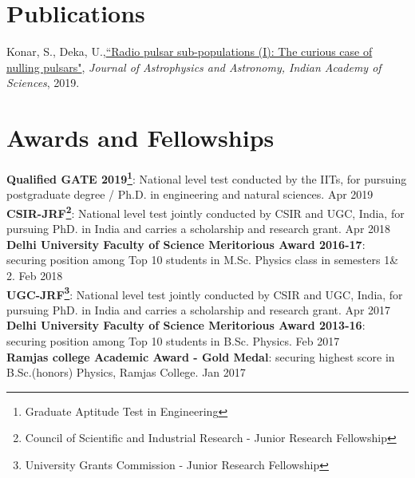 \documentclass[margin,line]{res}
\begin{document}
\begin{resume}
\section{\sc Publications}
\begin{itemize}[noitemsep]
{
\item Konar, S., Deka, U.,\href{https://www.ias.ac.in/article/fulltext/joaa/040/05/0042}{``Radio pulsar sub-populations (I): The curious case of nulling pulsars"}, \textit{Journal of Astrophysics and Astronomy, Indian Academy of Sciences}, 2019.
}\end{itemize}

\section{\sc Awards and Fellowships}

{\bf Qualified GATE 2019\footnote{Graduate Aptitude Test in Engineering}}: National level test conducted by the IITs, for pursuing postgraduate degree / Ph.D. in engineering and natural sciences. \hfill{Apr 2019} \\

{\bf CSIR-JRF\footnote{Council of Scientific and Industrial Research - Junior Research Fellowship}}: National level test jointly conducted by CSIR and UGC, India, for pursuing PhD. in India and carries a scholarship and research grant. \hfill{Apr 2018} \\

{\bf Delhi University Faculty of Science Meritorious Award 2016-17}: securing position among Top 10 students in M.Sc. Physics class in semesters 1\& 2. \hfill{Feb 2018} \\

{\bf UGC-JRF\footnote{University Grants Commission - Junior Research Fellowship}}: National level test jointly conducted by CSIR and UGC, India, for pursuing PhD. in India and carries a scholarship and research grant. \hfill{Apr 2017} \\

{\bf Delhi University Faculty of Science Meritorious Award 2013-16}: securing position among Top 10 students in B.Sc. Physics. \hfill{Feb 2017} \\

{\bf Ramjas college Academic Award - Gold Medal}: securing highest score in B.Sc.(honors) Physics, Ramjas College. \hfill{Jan 2017}


\end{resume}
\end{document}
